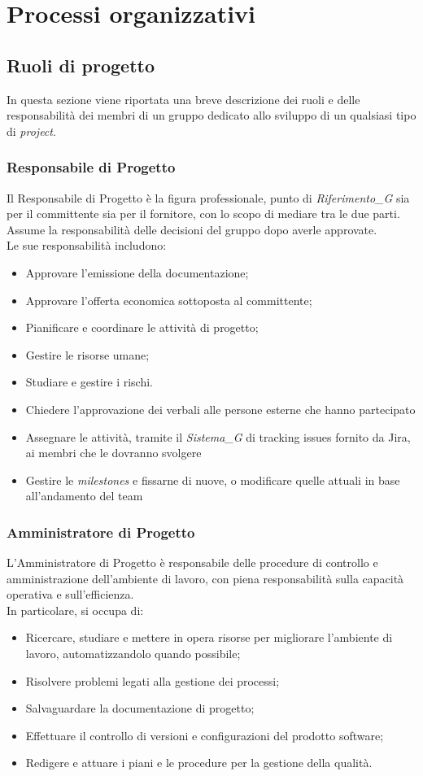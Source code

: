 \documentclass[12pt, oneside]{article}
\begin{document}
\newpage
\section{Processi organizzativi}
\subsection{Ruoli di progetto}
In questa sezione viene riportata una breve descrizione dei ruoli e delle responsabilità dei membri di un gruppo dedicato allo sviluppo di un qualsiasi tipo di \textit{project}. 
\subsubsection{Responsabile di Progetto}
Il Responsabile di Progetto è la figura professionale, punto di \textit{Riferimento_G} sia per il committente sia per il fornitore, con lo scopo di
mediare tra le due parti. Assume la responsabilità delle decisioni del gruppo dopo averle approvate.\\
Le sue responsabilità includono:
\begin{itemize}
    \item Approvare l’emissione della documentazione;
    \item Approvare l’offerta economica sottoposta al committente;
    \item Pianificare e coordinare le attività di progetto;
    \item Gestire le risorse umane;
    \item Studiare e gestire i rischi.
    \item Chiedere l'approvazione dei verbali alle persone esterne che hanno partecipato
    \item Assegnare le attività, tramite il \textit{Sistema_G} di tracking issues fornito da Jira, ai membri che le dovranno svolgere
    \item Gestire le \textit{milestones} e fissarne di nuove, o modificare quelle attuali in base all'andamento del team
\end{itemize}
\subsubsection{Amministratore di Progetto}
L'Amministratore di Progetto è responsabile delle procedure di controllo e amministrazione dell’ambiente di
lavoro, con piena responsabilità sulla capacità operativa e sull’efficienza.\\
In particolare, si occupa di:
\begin{itemize}
    \item Ricercare, studiare e mettere in opera risorse per migliorare l’ambiente di lavoro, automatizzandolo quando possibile;
    \item Risolvere problemi legati alla gestione dei processi;
    \item Salvaguardare la documentazione di progetto;
    \item Effettuare il controllo di versioni e configurazioni del prodotto software;
    \item Redigere e attuare i piani e le procedure per la gestione della qualità.
\end{itemize}
\end{document}
